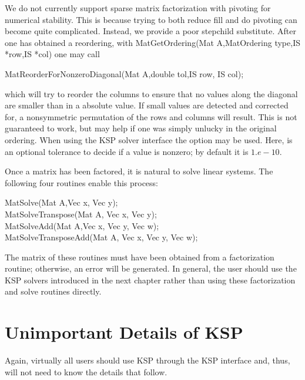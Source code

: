 {{{We do not currently support sparse matrix factorization with pivoting
for numerical stability. This is because trying to both reduce fill
and do pivoting can become quite complicated. Instead, we provide a 
poor stepchild substitute. After one has obtained a reordering, with
MatGetOrdering(Mat A,MatOrdering type,IS *row,IS *col) one
may call
\begin{tabbing}
  MatReorderForNonzeroDiagonal(Mat A,double tol,IS row, IS col);
\end{tabbing}
which will try to reorder the columns to ensure that no values along 
the diagonal are smaller than  in a absolute value. If small 
values are detected and corrected for, a nonsymmetric
permutation of the rows and columns will result. This is not guaranteed to work, 
but may help if one was simply unlucky in the original ordering.
 When using the KSP solver interface
the option  
may be used.  Here, 
is an optional tolerance to decide if a value is nonzero; by default it
is $ 1.e-10.$ 

Once a matrix has been factored, it is natural to solve linear systems.
The following four routines enable this process:  
\begin{tabbing}
  MatSolve(Mat A,Vec x, Vec y);\\
  MatSolveTranspose(Mat A, Vec x, Vec y);\\
  MatSolveAdd(Mat A,Vec x, Vec y, Vec w);\\
  MatSolveTransposeAdd(Mat A, Vec x, Vec y, Vec w);
\end{tabbing}
The  
matrix 
 of these routines must have been obtained from a 
factorization routine; otherwise, an error will be generated.
In general, the user should use the KSP solvers introduced in the 
next chapter rather than using these factorization and solve routines
directly.

\section{Unimportant Details of KSP}

Again, virtually all users should use KSP through the KSP interface
and, thus, will not need to know the details that follow. 

}}}
